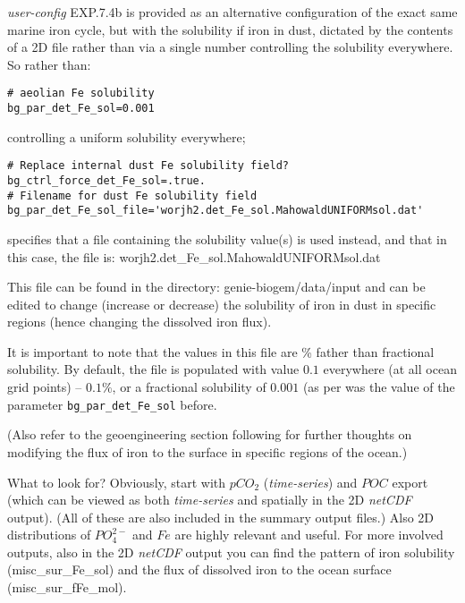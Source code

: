 \documentclass[11pt,fleqn]{book} %
\begin{document}
\begin{enumerate}[noitemsep]
\vspace{1mm}
\textit{user-config} \textsf{\footnotesize EXP.7.4b} is provided as an alternative configuration of the exact same marine iron cycle, but with the solubility if iron in dust, dictated by the contents of a 2D file rather than via a single number controlling the solubility everywhere. So rather than:
\vspace{-1mm}\small\begin{verbatim}
# aeolian Fe solubility
bg_par_det_Fe_sol=0.001
\end{verbatim}\normalsize\vspace{-1mm}
controlling a uniform solubility everywhere;
\vspace{-1mm}\small\begin{verbatim}
# Replace internal dust Fe solubility field?
bg_ctrl_force_det_Fe_sol=.true.
# Filename for dust Fe solubility field
bg_par_det_Fe_sol_file='worjh2.det_Fe_sol.MahowaldUNIFORMsol.dat'
\end{verbatim}\normalsize\vspace{-1mm}
specifies that a file containing the solubility value(s) is used instead, and that in this case, the file is: \textsf{\footnotesize worjh2.det\_Fe\_sol.MahowaldUNIFORMsol.dat}

\vspace{1mm}
This file can be found in the directory: \textsf{\footnotesize genie-biogem/data/input} and can be edited to change (increase or decrease) the solubility of iron in dust in specific regions (hence changing the dissolved iron flux). 

It is important to note that the values in this file are \% father than fractional solubility. By default, the file is populated with value \(0.1\) everywhere (at all ocean grid points) -- \(0.1\%\), or a fractional solubility of \(0.001\) (as per was the value of the parameter \texttt{\small bg\_par\_det\_Fe\_sol} before.

\vspace{1mm}
(Also refer to the geoengineering section following for further thoughts on modifying the flux of iron to the surface  in specific regions of the ocean.)

\end{enumerate}

\vspace{1mm}
\noindent What to look for? Obviously, start with \(pCO_{2}\) (\textit{time-series}) and \(POC\) export (which can be viewed as both \textit{time-series} and spatially in the 2D \textit{netCDF} output). (All of these are also included in the summary output files.) Also 2D distributions of \(PO^{2-}_{4}\) and \(Fe\) are highly relevant and useful. For more involved outputs, also in the  2D \textit{netCDF} output you can find the pattern of iron solubility (\textsf{\footnotesize misc\_sur\_Fe\_sol}) and the flux of dissolved iron to the ocean surface (\textsf{\footnotesize misc\_sur\_fFe\_mol}). 
\end{document}
